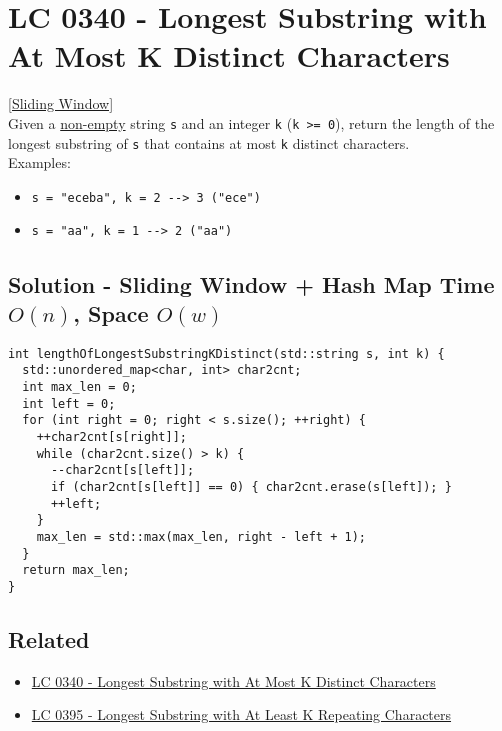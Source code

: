 {\section{LC 0340 - Longest Substring with At Most K Distinct Characters}\label{lc0340}
{\hyperref[sec:sliding_window]{[Sliding Window]}}\\

Given a \ul{non-empty} string {\colorbox{CodeBackground}{\lstinline|s|}} and an integer {\colorbox{CodeBackground}{\lstinline|k|}} ({\colorbox{CodeBackground}{\lstinline|k >= 0|}}), return the length of the longest substring of {\colorbox{CodeBackground}{\lstinline|s|}} that contains at most {\colorbox{CodeBackground}{\lstinline|k|}} distinct characters.\\

Examples:
\begin{itemize}
\item {\colorbox{CodeBackground}{\lstinline|s = "eceba", k = 2 --> 3 ("ece")|}}
\item {\colorbox{CodeBackground}{\lstinline|s = "aa", k = 1 --> 2 ("aa")|}}
\end{itemize}

\subsection*{Solution - Sliding Window + Hash Map {\scriptsize\color{gray}\Coffeecup\hspace{1mm}Time $O(n)$, Space $O(w)$}}
\begin{lstlisting}
int lengthOfLongestSubstringKDistinct(std::string s, int k) {
  std::unordered_map<char, int> char2cnt;
  int max_len = 0;
  int left = 0;
  for (int right = 0; right < s.size(); ++right) {
    ++char2cnt[s[right]];
    while (char2cnt.size() > k) {
      --char2cnt[s[left]];
      if (char2cnt[s[left]] == 0) { char2cnt.erase(s[left]); }
      ++left;
    }
    max_len = std::max(max_len, right - left + 1);
  }
  return max_len;
}
\end{lstlisting}

\subsection*{Related}
\begin{itemize}
\item \hyperref[lc0340]{LC 0340 - Longest Substring with At Most K Distinct Characters}
\item \hyperref[lc0395]{LC 0395 - Longest Substring with At Least K Repeating Characters}
\end{itemize}

}
